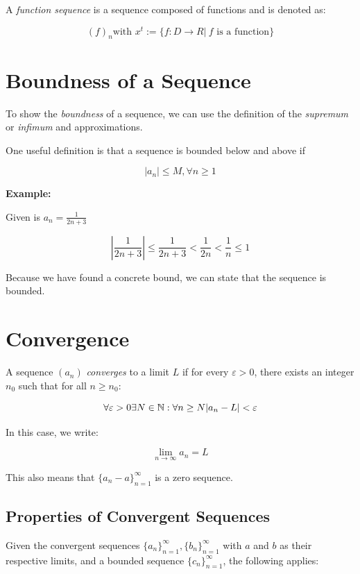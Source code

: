 A \emph{function sequence} is a sequence composed of functions and is denoted as:

\[
	{(f)}_n \text{with } x^t := \{ f: D\to R | \ f \text{ is a function}\}
\]

\section{Boundness of a Sequence}

To show the \emph{boundness} of a sequence, we can use the definition of the \emph{supremum} or \emph{infimum} and
approximations.

One useful definition is that a sequence is bounded below and above if

\[
	|a_n| \le M, \forall n \ge 1
\]

\textbf{Example:}

Given is \(a_n = \frac{1}{2n + 3}\)

\[
	\left| \frac{1}{2n + 3} \right| \le \frac{1}{2n + 3} < \frac{1}{2n} < \frac{1}{n} \le 1
\]

Because we have found a concrete bound, we can state that the sequence is bounded.

\section{Convergence}

A sequence \((a_n)\) \emph{converges} to a limit \(L\) if for every \(\varepsilon > 0\), there exists an
integer \(n_0\) such that for all \(n \ge n_0\):

\[
	\forall \varepsilon > 0 \exists N \in \mathbb{N}: \forall n \ge N |a_n - L| < \varepsilon
\]

In this case, we write:

\[
	\lim_{n \to \infty} a_n = L
\]

This also means that \(\{a_n - a\}_{n = 1}^{\infty}\) is a zero sequence.

\subsection{Properties of Convergent Sequences}

Given the convergent sequences \(\{a_n\}_{n = 1}^{\infty}, \{b_n\}_{n = 1}^{\infty}\) with \(a\) and \(b\) as their respective limits, and a bounded sequence \(\{c_n\}_{n = 1}^{\infty}\), the following applies:

